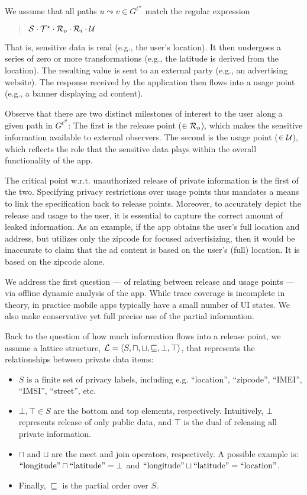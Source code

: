 \documentclass[]{article}
\begin{document}
We assume that all paths $u \leadsto v \in G^{t^{\#}}$ match the regular expression
\begin{quote}
	${\cal S} \cdot {\cal T}^{\star} \cdot {\cal R}_o \cdot {\cal R}_i \cdot {\cal U}$
\end{quote}
That is, sensitive data is read (e.g., the user's location). It then undergoes a series of zero or more transformations (e.g., the latitude is derived from the location). The resulting value is sent to an external party (e.g., an advertising website). The response received by the application then flows into a usage point (e.g., a banner displaying ad content).

Observe that there are two distinct milestones of interest to the user along a given path in $G^{t^{\#}}$: The first is the release point ($\in {\cal R}_o$), which makes the sensitive information available to external observers. The second is the usage point ($\in {\cal U}$), which reflects the role that the sensitive data plays within the overall functionality of the app.

The critical point w.r.t. unauthorized release of private information is the first of the two. Specifying privacy restrictions over usage points thus mandates a means to link the specification back to release points. Moreover, to accurately depict the release and usage to the user, it is essential to capture the correct amount of leaked information. As an example, if the app obtains the user's full location and address, but utilizes only the zipcode for focused advertisizing, then it would be inaccurate to claim that the ad content is based on the user's (full) location. It is based on the zipcode alone.

We address the first question --- of relating between release and usage points --- via offline dynamic analysis of the app. While trace coverage is incomplete in theory, in practice mobile apps typically have a small number of UI states. We also make conservative yet full precise use of the partial information.

Back to the question of how much information flows into a release point, we assume a lattice structure,
${\cal L} = \left\langle S,\sqcap,\sqcup,\sqsubseteq,\bot,\top \right\rangle$, that represents the relationships between private data items:
\begin{itemize}
	\item $S$ is a finite set of privacy labels, including e.g. ``location'', ``zipcode'', ``IMEI'', ``IMSI'', ``street'', etc.
	\item $\bot,\top \in S$ are the bottom and top elements, respectively. Intuitively, $\bot$ represents release of only public data, and $\top$ is the dual of releasing all private information.
	\item $\sqcap$ and $\sqcup$ are the meet and join operators, respectively. A possible example is: $\textnormal{``longitude''} \sqcap \textnormal{``latitude''} = \bot$ and $\textnormal{``longitude''} \sqcup \textnormal{``latitude''} = \textnormal{``location''}$.
	\item Finally, $\sqsubseteq$ is the partial order over $S$.
\end{itemize}
\end{document}
